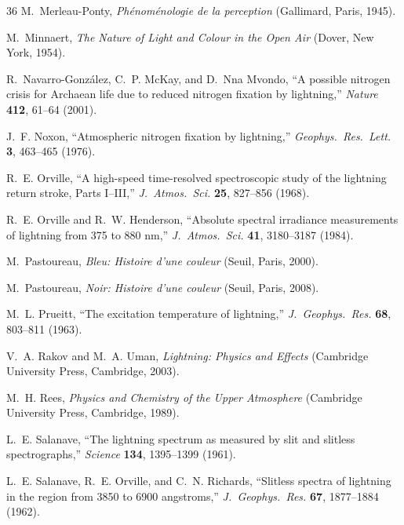 \documentclass[11pt,a4paper]{article}
\begin{document}
\begin{thebibliography}{36}
M.~Merleau-Ponty, \emph{Ph\'enom\'enologie de la perception} (Gallimard,
Paris, 1945).

M.~Minnaert, \emph{The Nature of Light and Colour in the Open Air}
(Dover, New York, 1954).

R.~Navarro-Gonz\'alez, C.~P. McKay, and D.~Nna Mvondo, ``A possible nitrogen
crisis for Archaean life due to reduced nitrogen fixation by lightning,''
\emph{Nature} \textbf{412}, 61--64 (2001).

J.~F. Noxon, ``Atmospheric nitrogen fixation by lightning,'' \emph{Geophys.\
Res.\ Lett.} \textbf{3}, 463--465 (1976).

R.~E. Orville, ``A high-speed time-resolved spectroscopic study of the
lightning return stroke, Parts I--III,'' \emph{J.\ Atmos.\ Sci.}
\textbf{25}, 827--856 (1968).

R.~E. Orville and R.~W. Henderson, ``Absolute spectral irradiance
measurements of lightning from 375 to 880 nm,'' \emph{J.\ Atmos.\ Sci.}
\textbf{41}, 3180--3187 (1984).

M.~Pastoureau, \emph{Bleu: Histoire d'une couleur} (Seuil, Paris, 2000).

M.~Pastoureau, \emph{Noir: Histoire d'une couleur} (Seuil, Paris, 2008).

M.~L. Prueitt, ``The excitation temperature of lightning,'' \emph{J.\
Geophys.\ Res.} \textbf{68}, 803--811 (1963).

V.~A. Rakov and M.~A. Uman, \emph{Lightning: Physics and Effects}
(Cambridge University Press, Cambridge, 2003).

M.~H. Rees, \emph{Physics and Chemistry of the Upper Atmosphere}
(Cambridge University Press, Cambridge, 1989).

L.~E. Salanave, ``The lightning spectrum as measured by slit and slitless
spectrographs,'' \emph{Science} \textbf{134}, 1395--1399 (1961).

\bibitem[Salanave et al.(1962)]{salanave1962}
L.~E. Salanave, R.~E. Orville, and C.~N. Richards, ``Slitless spectra of
lightning in the region from 3850 to 6900 angstroms,'' \emph{J.\ Geophys.\
Res.} \textbf{67}, 1877--1884 (1962).


\end{thebibliography}
\end{document}
